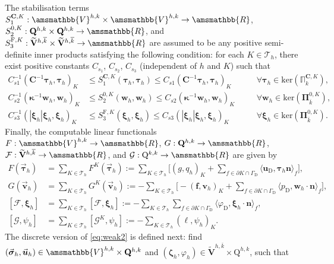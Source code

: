 \documentclass[fleqn,a4paper]{cas-sc}
\newcommand{\bC}{\mathbf{C}}
\newcommand{\bbR}{\amsmathbb{R}}
\newcommand\RR{\bbR}
\newcommand{\bu}{\boldsymbol{u}}
\newcommand{\bn}{\boldsymbol{n}}
\newcommand{\bv}{\boldsymbol{v}}
\newcommand{\bw}{\boldsymbol{w}}
\newcommand{\ff}{\boldsymbol{f}}
\newcommand{\bkappa}{\boldsymbol{\kappa}}
\newcommand{\bxi}{\boldsymbol{\xi}}
\newcommand{\bzeta}{\boldsymbol{\zeta}}
\newcommand{\bPi}{\boldsymbol{\Pi}}
\newcommand{\0}{\boldsymbol{0}}
\newcommand\cG{\mathcal{G}}
\newcommand\cT{\mathcal{T}}
\newcommand\cF{\mathcal{F}}
\newcommand\bQ{\mathbf{Q}}
\newcommand\bV{\mathbf{V}}
\newcommand\rQ{\mathrm{Q}}
\newcommand\bbV{\amsmathbb{V}}
\newcommand\rF{\mathrm{F}}
\newcommand\bbPi{\mathbb{\Pi}}
\newcommand\bsigma{\boldsymbol{\sigma}}
\newcommand\btau{\boldsymbol{\tau}}
\numberwithin{equation}{section}
\numberwithin{figure}{section}
\begin{document}
The stabilisation terms $S_1^{\bC,K}:\bbV^{h,k}\times\bbV^{h,k}\to\RR$, $S_2^{0,K}:\bQ^{h,k}\times\bQ^{h,k}\to\RR$, and {$S_3^{\rF,K}:\widetilde{\bV}^{h,\overline{k}}\times \widetilde{\bV}^{h,\overline{k}}\to \RR$} are assumed to be any positive semi-definite inner products satisfying the following condition: for each $K\in\cT_h$, there exist positive constants $C_{s_1}$, $C_{s_2}$, $C_{s_3}$ (independent of $h$ and $K$) such that
\begin{subequations}\label{stab_bounds}
    \begin{alignat}{2}
        C_{s1}^{-1}(\bC^{-1}\btau_h, \btau_h)_K&\leq S_1^{\bC,K}(\btau_h,\btau_h)\leq C_{s1}(\bC^{-1}\btau_h, \btau_h)_K\quad &&\forall \btau_h\in \mathrm{ker}(\bbPi_{k}^{\bC,K}),\label{s1}\\
        C_{s2}^{-1}(\bkappa^{-1}\bw_h,\bw_h)_K&\leq S_2^{0,K}(\bw_h,\bw_h)\leq C_{s2}(\bkappa^{-1}\bw_h,\bw_h)_K\quad &&\forall \bw_h\in \mathrm{ker}(\bPi_{\overline{k}}^{0,K}),\label{s2}\\
        {C_{s3}^{-1}(|\bxi_h|\bxi_h,\bxi_h)_K}&{\leq S_3^{\rF,K}(\bxi_h,\bxi_h)\leq C_{s3}(|\bxi_h|\bxi_h,\bxi_h)_K}\quad &&\forall \bxi_h\in \mathrm{ker}(\bPi_{\overline{k}}^{0,K}).\label{s3}
    \end{alignat}
\end{subequations}
Finally, the computable linear functionals $F: \bbV^{h,k}\to \RR$, $G: \bQ^{h,k}\to\RR$, $\cF:\widetilde{\bV}^{h,\overline{k}}\to \RR$, and $\cG: \rQ^{k,k}\to \RR$ are given by
\begin{align*}
    F(\vec{\btau}_h) &= \sum_{K\in \cT_h} F^K(\vec{\btau}_h) := \sum_{K\in \cT_h} \biggl[ (g,q_h)_K  + \sum_{f\in \partial K\cap \Gamma_{\mathrm{D}}}\langle \bu_{\mathrm{D}},\btau_h\bn\rangle_{f} \biggr], \\
    G(\vec{\bv}_h) &= \sum_{K\in \cT_h} G^K(\vec{\bv}_h) := - \sum_{K\in \cT_h} \biggl[ -(\ff,\bv_h)_K + \sum_{f\in \partial K\cap \Gamma_{\mathrm{D}}} \langle p_{\mathrm{D}},\bw_h\cdot\bn\rangle_{f}\biggr], \\
    {[\cF,\bxi_h]} &{= \sum_{K\in \cT_h} [\cF,\bxi_h] := - \sum_{K\in \cT_h} \sum_{f\in \partial K\cap \Gamma_{\mathrm{D}}} \langle \varphi_{\mathrm{D}},\bxi_h\cdot\bn\rangle_{f},} \\
    {[\cG,\psi_h]} &{= \sum_{K\in \cT_h} [\cG^K,\psi_h] := - \sum_{K\in \cT_h} (\ell,\psi_h)_K.}
\end{align*}
The discrete version of \eqref{eq:weak2} is defined next: find $(\vec{\bsigma}_h, \vec{\bu}_h) \in \bbV^{h,k} \times \bQ^{h,k}$ and $(\bzeta_h, \varphi_h) \in \widetilde{\bV}^{h,\overline{k}} \times \rQ^{h,k}$, such that
\end{document}
